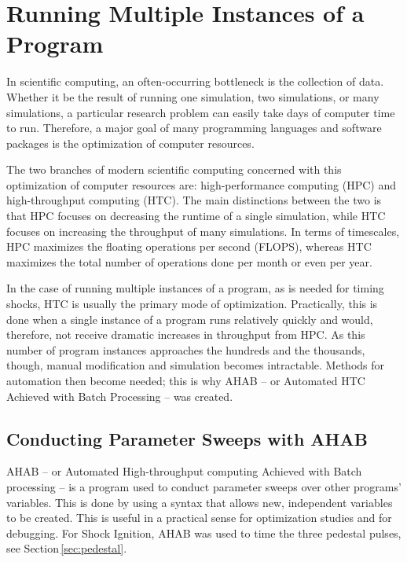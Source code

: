 
\vspace{24pt}

\chapter[\textbf{Running Multiple Instances of a Program}]{Running Multiple Instances of a Program}
In scientific computing, an often-occurring bottleneck is the collection of data.  Whether it be the result of running one simulation, two simulations, or many simulations, a particular research problem can easily take days of computer time to run.  Therefore, a major goal of many  programming languages and software packages is the optimization of computer resources.

The two branches of modern scientific computing concerned with this optimization of computer resources are: high-performance computing (HPC) and high-throughput computing (HTC).  The main distinctions between the two is that HPC focuses on decreasing the runtime of a single simulation, while HTC focuses on increasing the throughput of many simulations.  In terms of timescales, HPC maximizes the floating operations per second (FLOPS), whereas HTC maximizes the total number of operations done per month or even per year.

In the case of running multiple instances of a program, as is needed for timing shocks, HTC is usually the primary mode of optimization.  Practically, this is done when a single instance of a program runs relatively quickly and would, therefore, not receive dramatic increases in throughput from HPC.  As this number of program instances approaches the hundreds and the thousands, though, manual modification and simulation becomes intractable.  Methods for automation then become needed; this is why AHAB -- or Automated HTC Achieved with Batch Processing -- was created.

  \section{Conducting Parameter Sweeps with AHAB}

AHAB -- or Automated High-throughput computing Achieved with Batch processing -- is a program used to conduct parameter sweeps over other programs' variables. This is done by using a syntax that allows new, independent variables to be created.  This is useful in a practical sense for optimization studies and for debugging.  For Shock Ignition, AHAB was used to time the three pedestal pulses, see Section\,\ref{sec:pedestal}.

